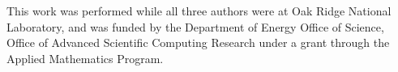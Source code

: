 \documentclass[conference]{IEEEtran}
\begin{document}
This work was performed while all three authors were at Oak Ridge National Laboratory, and was funded by the Department of Energy Office of Science, Office of Advanced Scientific Computing Research under a grant through the Applied Mathematics Program.
\begin{singlespace}
\small


\end{singlespace}
\end{document}
